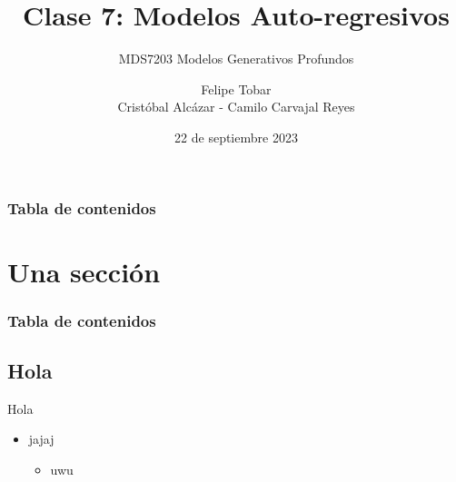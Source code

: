 \documentclass[9pt]{beamer}
\title{Clase 7: Modelos Auto-regresivos}
\subtitle{MDS7203 Modelos Generativos Profundos}
\date{22 de septiembre 2023}
\author{Felipe Tobar \\ Cristóbal Alcázar - Camilo Carvajal Reyes}
\institute{Iniciativa de Datos e Inteligencia Artificial\\Universidad de Chile}
\begin{document}
\begin{frame}
  \titlepage
\end{frame}

\begin{frame}
    \frametitle{Tabla de contenidos}
    \tableofcontents
\end{frame}


\section{Una sección}
\begin{frame}
    \frametitle{Tabla de contenidos}
    \tableofcontents[currentsection]
\end{frame}

\subsection{Hola}
\begin{frame}{Hola}
    \begin{itemize}
        \item jajaj
        \begin{itemize}
            \item uwu
        \end{itemize}
    \end{itemize}
\end{frame}



% 
\end{document}
